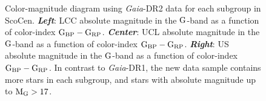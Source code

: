 \begin{figure}[!ht]
\centering
\caption{\scriptsize{Color-magnitude diagram using \textit{Gaia}-DR2 data for each subgroup in ScoCen. \textit{\textbf{Left}}: LCC absolute magnitude in the $\textnormal{G}$-band as a function of color-index $\textnormal{G}_\textnormal{BP} - \textnormal{G}_\textnormal{RP}$. \textit{\textbf{Center}}: UCL absolute magnitude in the $\textnormal{G}$-band as a function of color-index $\textnormal{G}_\textnormal{BP} - \textnormal{G}_\textnormal{RP}$. \textit{\textbf{Right}}: US absolute magnitude in the $\textnormal{G}$-band as a function of color-index $\textnormal{G}_\textnormal{BP} - \textnormal{G}_\textnormal{RP}$. In contrast to \textit{Gaia}-DR1, the new data sample contains more stars in each subgroup, and stars with absolute magnitude up to $\textnormal{M}_\textnormal{G} > 17$.}}
\label{fig:NewData_DR2}
\end{figure}

